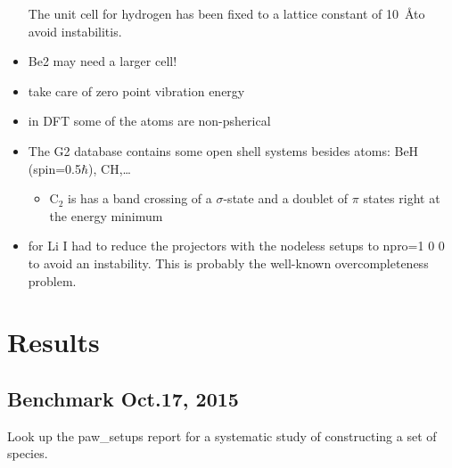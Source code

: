 \documentclass{book}
\begin{document}
\begin{itemize}
The unit cell for hydrogen has been fixed to a lattice constant of
10~\AA to avoid instabilitis.

\item Be2 may need a larger cell!
\item take care of zero point vibration energy
\item in DFT some of the atoms are non-psherical
\item The G2 database contains some open shell systems besides atoms:
BeH (spin=0.5$\hbar$), CH,\ldots
\begin{itemize}
\item C$_2$ is has a band crossing of a $\sigma$-state and a doublet of
$\pi$ states right at the energy minimum
\end{itemize}
\item for Li I had to reduce the projectors with the nodeless
  setups to npro=1 0 0 to avoid an instability. This is probably
  the well-known overcompleteness problem.
\end{itemize}

\newpage
\section*{Results}

\subsection*{Benchmark Oct.17, 2015}
Look up the paw\_setups report for a systematic study of constructing a
set of species.
\end{document}
